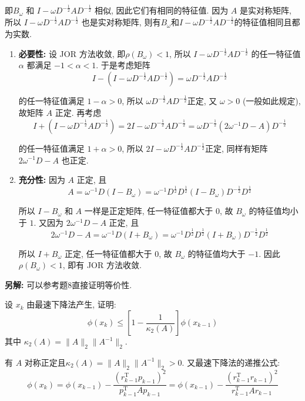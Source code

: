 \documentclass[12pt, answers]{exam}     %
\newcommand{\anothersolution}{\par\noindent\textbf{另解:}}
\newcommand{\T}{\mathrm{T}}
\begin{document}
\begin{questions}
\begin{solution}
即$B_{\omega}$ 和 $I - \omega D^{-\frac{1}{2}}AD^{-\frac{1}{2}}$ 相似, 因此它们有相同的特征值. 因为 $A$ 是实对称矩阵, 所以 $I - \omega D^{-\frac{1}{2}}AD^{-\frac{1}{2}}$ 也是实对称矩阵, 
则有\(B_{\omega}\)和\(I - \omega D^{-\frac{1}{2}}AD^{-\frac{1}{2}}\)的特征值相同且都为实数. 

\begin{enumerate}
\item \textbf{必要性:}
设 JOR 方法收敛, 即$\rho(B_{\omega}) < 1$, 所以 $I - \omega D^{-\frac{1}{2}}AD^{-\frac{1}{2}}$ 的任一特征值 $\alpha$ 都满足 $-1 < \alpha < 1$. 
于是考虑矩阵
\[
I - (I - \omega D^{-\frac{1}{2}}AD^{-\frac{1}{2}}) = \omega D^{-\frac{1}{2}}AD^{-\frac{1}{2}}
\]

的任一特征值满足 $1 - \alpha > 0$, 所以 $\omega D^{-\frac{1}{2}}AD^{-\frac{1}{2}}$正定, 
又 $ \omega > 0 $ (一般如此规定), 故矩阵 $A$ 正定. 再考虑
\[
I + (I - \omega D^{-\frac{1}{2}}AD^{-\frac{1}{2}}) = 2I - \omega D^{-\frac{1}{2}}AD^{-\frac{1}{2}} = \omega D^{-\frac{1}{2}}(2\omega^{-1}D - A)D^{-\frac{1}{2}}
\]

的任一特征值满足 $1 + \alpha > 0$, 所以 $2I - \omega D^{-\frac{1}{2}}AD^{-\frac{1}{2}}$正定, 
同样有矩阵 $2\omega^{-1}D - A$ 也正定. 

\item \textbf{充分性:}
因为 $A$ 正定, 且
\[
A = \omega^{-1}D(I - B_{\omega}) = \omega^{-1} D^{\frac{1}{2}} D^{\frac{1}{2}}(I - B_{\omega} )D^{-\frac{1}{2}}D^{\frac{1}{2}}  
\]

所以 $I - B_{\omega}$ 和 $A$ 一样是正定矩阵, 任一特征值都大于 $0$, 故 $B_{\omega}$ 的特征值均小于 $1$. 又因为 $2\omega^{-1}D - A$ 正定, 且
\[
2\omega^{-1}D - A = \omega^{-1}D(I + B_{\omega}) = \omega^{-1} D^{\frac{1}{2}} D^{\frac{1}{2}}(I + B_{\omega} )D^{-\frac{1}{2}}D^{\frac{1}{2}}    
\]

所以 $I + B_{\omega}$ 正定, 任一特征值都大于 $0$, 故 $B_{\omega}$ 的特征值均大于 $-1$. 因此 $\rho(B_{\omega}) < 1$, 即有 JOR 方法收敛. 
\end{enumerate}
\anothersolution{}
可以参考题8直接证明等价性.
\end{solution}

\question{}设 $x_k$ 由最速下降法产生, 证明:
\[
\phi(x_k) \leq \left[1 - \frac{1}{\kappa_2(A)}\right] \phi(x_{k-1})
\]
其中 $\kappa_2(A) = \|A\|_2 \|A^{-1}\|_2$. 
\begin{solution}
有 $A$ 对称正定且$\kappa_2(A) = \|A\|_2 \|A^{-1}\|_2 > 0$. 又最速下降法的递推公式:
\[
\phi(x_k) = \phi(x_{k-1}) - \frac{(r_{k-1}^{\T} p_{k-1})^2}{p_{k-1}^{\T} A p_{k-1}} = \phi(x_{k-1}) - \frac{(r_{k-1}^{\T} r_{k-1})^2}{r_{k-1}^{\T} A r_{k-1}}
\]


\end{solution}
\end{questions}
\end{document}
